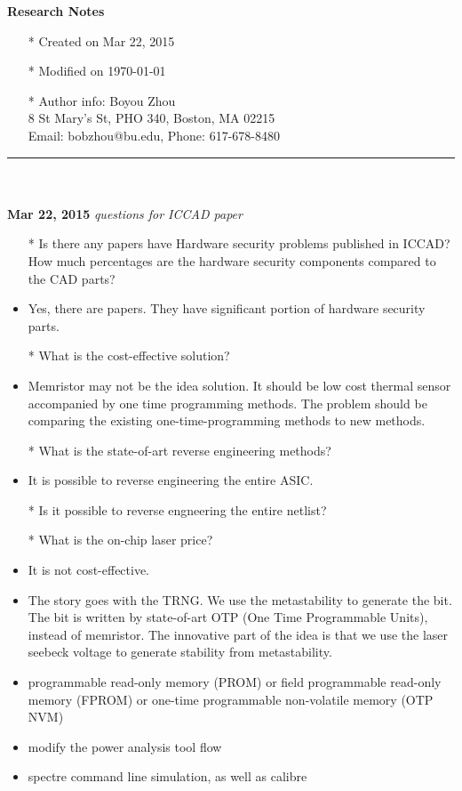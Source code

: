 \documentclass[]{article}
\begin{document}
\pagestyle{empty}
{\large\textbf{Research Notes}}
\begin{itemize}
    \item[*] Created on Mar 22, 2015
    \item[*] Modified on \today
    \item[*] Author info: Boyou Zhou\\
             8 St Mary's St, PHO 340, Boston, MA 02215\\
             Email: bobzhou@bu.edu, Phone: 617-678-8480
\end{itemize}


\rule[-0.1cm]{7.5in}{0.01cm}\\
\\

\noindent \textbf{Mar 22, 2015}
\textit{questions for ICCAD paper}
\indent		\begin{itemize}

                \item [*] Is there any papers have Hardware security problems
                published in ICCAD? How much percentages are the hardware
                security components compared to the CAD parts?
                \item Yes, there are papers. They have significant portion
                of hardware security parts.
                \item [*] What is the cost-effective solution?
                \item Memristor may not be the idea solution. It should be low
                cost thermal sensor accompanied by one time programming methods.
                The problem should be comparing the existing
                one-time-programming methods to new methods.
                \item [*] What is the state-of-art reverse engineering methods?
                \item It is possible to reverse engineering the entire ASIC.
                \item [*] Is it possible to reverse engneering the entire
                netlist?
                \item [*] What is the on-chip laser price?
                \item It is not cost-effective.
                \item {\color{red}The story goes with the TRNG. We use the metastability
                to generate the bit. The bit is written by state-of-art OTP (One
                Time Programmable Units), instead of memristor. The innovative
                part of the idea is that we use the laser seebeck voltage to
                generate stability from metastability.}
                \item programmable read-only memory (PROM) or field programmable
                read-only memory (FPROM) or one-time programmable non-volatile
                memory (OTP NVM) 
                \item modify the power analysis tool flow
                \item spectre command line simulation, as well as calibre
                
        \end{itemize}
\end{document}

